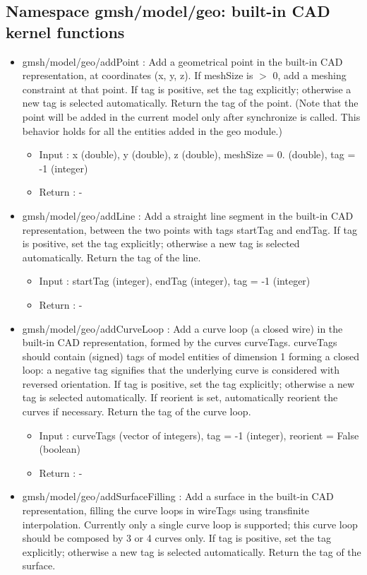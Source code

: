 \documentclass[dvipdfmx, 9pt, a4paper]{article}
\numberwithin{equation}{section}
\begin{document}
\subsection{Namespace gmsh/model/geo: built-in CAD kernel functions}
\begin{itemize}
\item gmsh/model/geo/addPoint : Add a geometrical point in the built-in CAD representation, at coordinates (x, y, z). If meshSize is $>$ 0, add a meshing constraint at that point. If tag is positive, set the tag explicitly; otherwise a new tag is selected automatically. Return the tag of the point. (Note that the point will be added in the current model only after synchronize is called. This behavior holds for all the entities added in the geo module.)
\begin{itemize}
\item Input : x (double), y (double), z (double), meshSize = 0. (double), tag = -1 (integer)
\item Return : -
\end{itemize}
\item gmsh/model/geo/addLine : Add a straight line segment in the built-in CAD representation, between the two points with tags startTag and endTag. If tag is positive, set the tag explicitly; otherwise a new tag is selected automatically. Return the tag of the line.
\begin{itemize}
\item Input : startTag (integer), endTag (integer), tag = -1 (integer)
\item Return : -
\end{itemize}
\item gmsh/model/geo/addCurveLoop : Add a curve loop (a closed wire) in the built-in CAD representation, formed by the curves curveTags. curveTags should contain (signed) tags of model entities of dimension 1 forming a closed loop: a negative tag signifies that the underlying curve is considered with reversed orientation. If tag is positive, set the tag explicitly; otherwise a new tag is selected automatically. If reorient is set, automatically reorient the curves if necessary. Return the tag of the curve loop.
\begin{itemize}
\item Input : curveTags (vector of integers), tag = -1 (integer), reorient = False (boolean)
\item Return : -
\end{itemize}
\item gmsh/model/geo/addSurfaceFilling : Add a surface in the built-in CAD representation, filling the curve loops in wireTags using transfinite interpolation. Currently only a single curve loop is supported; this curve loop should be composed by 3 or 4 curves only. If tag is positive, set the tag explicitly; otherwise a new tag is selected automatically. Return the tag of the surface.

\end{itemize}
\end{document}
